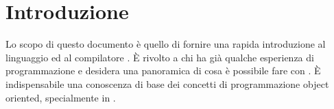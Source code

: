 \section{Introduzione}
\label{sec:introduction}

Lo scopo di questo documento \`e quello di fornire una rapida introduzione al linguaggio ed al compilatore \Scala. 
\`E rivolto a chi ha gi\`a qualche esperienza di programmazione e desidera una panoramica di cosa \`e possibile fare con \Scala. 
\`E indispensabile una conoscenza di base dei concetti di programmazione object oriented, specialmente in \Java.